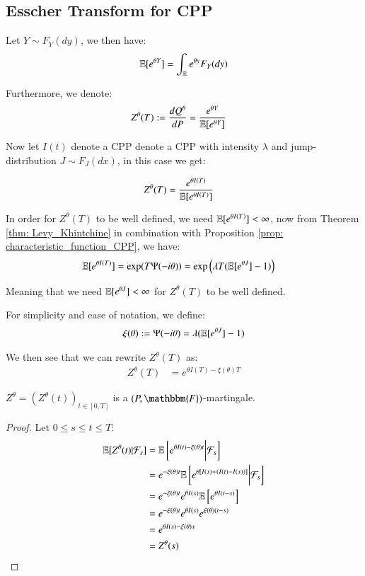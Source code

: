 \newpage 


\subsection{Esscher Transform for CPP}
Let $Y\sim F_{Y}(dy)$, we then have: 
\[
\mathbb{E}[e^{\theta Y}] = \int_{\mathbb{R}}e^{\theta y}F_{Y}(dy)
\]

Furthermore, we denote: 
\begin{align*}
Z^{\theta}(T) &:= \frac{dQ^{\theta}}{dP} = \frac{e^{\theta Y}}{\mathbb{E}[e^{\theta Y}]}   
\end{align*} 

Now let $I(t)$ denote a CPP denote a CPP with intensity $\lambda$ and jump-distribution $J \sim F_{J}(dx)$, in this case we get: 

\begin{align*}
Z^{\theta}(T) &= \frac{
e^{\theta I(T)}
}{
\mathbb{E}[e^{\theta I(T)}]
}    
\end{align*} 

In order for $Z^{\theta}(T)$ to be well defined, we need $\mathbb{E}[e^{\theta I(T)}] < \infty $, now from Theorem \ref{thm: Levy_Khintchine} in combination with Proposition \ref{prop: characteristic_function_CPP}, we have:
\begin{align*}
\mathbb{E}[e^{\theta I(T)}] &= \exp(T\Psi(-i\theta))  
= 
\exp\left(
\lambda T(\mathbb{E}[e^{\theta J}] -1)
\right)
\end{align*} 

Meaning that we need $\mathbb{E}[e^{\theta J}] < \infty $ for $Z^{\theta}(T)$ to be well defined. 

\begin{notation}
For simplicity and ease of notation, we define: 
\begin{align*}
\xi(\theta) := \Psi(-i\theta) = \lambda(\mathbb{E}[e^{\theta J}] -1)    
\end{align*}
\end{notation}

We then see that we can rewrite $Z^{\theta}(T)$ as: 
\begin{align*}
Z^{\theta}(T) &= e^{\theta I(T) - \xi(\theta)T}    
\end{align*}

\begin{proposition}
$Z^{\theta} = (Z^{\theta}(t))_{t\in [0,T]}$ is a $(P, \mathbbm{F})$-martingale.     
\end{proposition}

\begin{proof}
Let $0 \leq s \leq t \leq T$: 
\begin{align*}
\mathbb{E}[Z^{\theta}(t)|\mathcal{F}_{s}] &= 
\mathbb{E}\left[
e^{\theta I(t) - \xi(\theta)t}
\bigg{|}\mathcal{F}_{s}\right] \\ 
&= 
e^{-\xi(\theta)t}\mathbb{E}\left[
e^{\theta[I(s) + (I(t)-I(s))]}
\bigg{|}\mathcal{F}_{s}\right] \\ 
&= 
e^{-\xi(\theta)t}e^{\theta I(s)}\mathbb{E}\left[
e^{\theta I(t-s)}
\right] \\ 
&= 
e^{-\xi(\theta)t}e^{\theta I(s)}e^{\xi(\theta)(t-s)} \\ 
&= e^{\theta I(s) - \xi(\theta)s} \\ 
&= Z^{\theta}(s)
\end{align*}
\end{proof}

